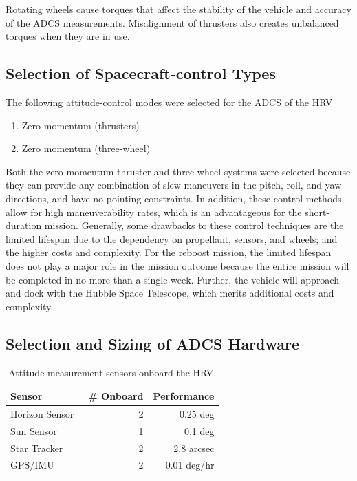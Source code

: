 \documentclass[paper=letter, fontsize=11pt]{scrartcl} %
\numberwithin{equation}{section} %
\numberwithin{figure}{section} %
\numberwithin{table}{section} %
\begin{document}
\bigskip
\par Rotating wheels cause torques that affect the stability of the vehicle and accuracy of the ADCS measurements. Misalignment of thrusters also creates unbalanced torques when they are in use.

\subsection{Selection of Spacecraft-control Types}
The following attitude-control modes were selected for the ADCS of the HRV
\begin{enumerate}
    \item Zero momentum (thrusters)
    \item Zero momentum (three-wheel)
\end{enumerate}

\par Both the zero momentum thruster and three-wheel systems were selected because they can provide any combination of slew maneuvers in the pitch, roll, and yaw directions, and have no pointing constraints. In addition, these control methods allow for high maneuverability rates, which is an advantageous for the short-duration mission. Generally, some drawbacks to these control techniques are the limited lifespan due to the dependency on propellant, sensors, and wheels; and the higher costs and complexity. For the reboost mission, the limited lifespan does not play a major role in the mission outcome because the entire mission will be completed in no more than a single week. Further, the vehicle will approach and dock with the Hubble Space Telescope, which merits additional costs and complexity.

\subsection{Selection and Sizing of ADCS Hardware}

\begin{table}[H]
    \begin{center}
        \begin{tabular}{l r r}
            \toprule
            Sensor                             & \# Onboard & Performance \\
            \midrule
            Horizon Sensor~\cite{earth_sensor} & 2          & 0.25 deg    \\
            Sun Sensor~\cite{sun_sensor}       & 1          & 0.1 deg     \\
            Star Tracker~\cite{star_tracker}   & 2          & 2.8 arcsec  \\
            GPS/IMU~\cite{gps_ins}             & 2          & 0.01 deg/hr \\
            \bottomrule
        \end{tabular}
    \end{center}
    \caption{Attitude measurement sensors onboard the HRV.}
\end{table}
\end{document}
